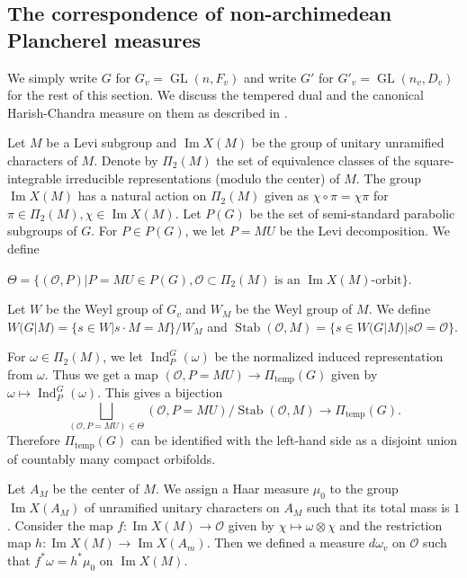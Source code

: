 \documentclass[11pt]{article}
\theoremstyle{plain}
\theoremstyle{remark}
\theoremstyle{definition}
\DeclareMathOperator{\im}{Im}
\DeclareMathOperator{\Ind}{Ind}
\DeclareMathOperator{\GL}{GL}
\DeclareMathOperator{\tp}{temp}
\DeclareMathOperator{\Stb}{Stab}
\begin{document}
\subsection{The correspondence of non-archimedean Plancherel measures}\label{ssJLp}





We simply write $G$ for $G_v=\GL(n,F_v)$ and write $G'$ for $G'_v=\GL(n_v,D_v)$ for the rest of this section.  
We discuss the tempered dual and the canonical Harish-Chandra measure on them as described in \cite{Waldsp03}. 

Let $M$ be a Levi subgroup and $\im X(M)$ be the group of unitary unramified characters of $M$. 
Denote by $\Pi_2(M)$ the set of equivalence classes of the square-integrable irreducible representations (modulo the center) of $M$. 
The group $\im X(M)$ has a natural action on $\Pi_2(M)$ given as $\chi\circ \pi=\chi\pi$ for $\pi \in \Pi_2(M), \chi\in \im X(M)$. 
Let $P(G)$ be the set of semi-standard parabolic subgroups of $G$. 
For $P\in P(G)$, we let $P=MU$ be the Levi decomposition. 
We define
\begin{center}
    $\Theta=\{(\mathcal{O},P)|P=MU\in P(G), \mathcal{O}\subset \Pi_2(M)\text{ is an } \im X(M)\text{-orbit}\}$. 
\end{center}
Let $W$ be the Weyl group of $G_v$ and $W_M$ be the Weyl group of $M$.
We define $W(G|M)=\{s\in W|s\cdot M=M\}/W_M$ and $\Stb(\mathcal{O},M)=\{s\in W(G|M)|s\mathcal{O}=\mathcal{O}\}$. 

For $\omega \in \Pi_2(M)$, we let $\Ind^G_{P}(\omega)$ be the normalized induced representation from $\omega$. 
Thus we get a map $(\mathcal{O},P=MU)\to \Pi_{\tp}(G)$ given by $\omega\mapsto \Ind^G_{P}(\omega)$. 
This gives a bijection
\begin{equation}\label{ebijetion}
    \bigsqcup\limits_{(\mathcal{O},P=MU)\in \Theta}(\mathcal{O},P=MU)/\Stb(\mathcal{O},M) \to \Pi_{\tp}(G). 
\end{equation}
Therefore $\Pi_{\tp}(G)$ can be identified with the left-hand side as a disjoint union of countably many compact orbifolds. 

Let $A_M$ be the center of $M$. 
We assign a Haar measure $\mu_{0}$ to the group $\im X(A_M)$ of unramified unitary characters on $A_M$ such that its total mass is $1$. 
Consider the map $f\colon\im X(M)\to\mathcal{O}$ given by $\chi\mapsto \omega\otimes \chi$ and the restriction map $h\colon \im X(M)\to \im X(A_m)$. 
Then we defined a measure $d \omega_v$ on $\mathcal{O}$ such that $f^{*}\omega=h^{*}\mu_{0}$ on $\im X(M)$. 
\end{document}
